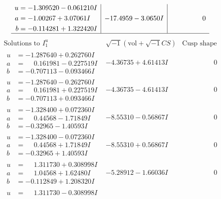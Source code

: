 \documentclass[1p]{elsarticle_modified}
\theoremstyle{definition}
\newcommand{\I}{\sqrt{-1}}
\begin{document}
$$\begin{array}{c|c|c}
\begin{aligned}
u &= -1.309520 - 0.061210 I \\
a &= -1.00267 + 3.07061 I \\
b &= -0.114281 + 1.322420 I\end{aligned}
 & -17.4959 - 3.0650 I & \phantom{-0.000000 } 0\\
 \hline 
 \end{array}$$\newpage$$\begin{array}{c|c|c}  
\text{Solutions to }I^u_{1}& \I (\text{vol} + \sqrt{-1}CS) & \text{Cusp shape}\\
 \hline 
\begin{aligned}
u &= -1.287640 + 0.262760 I \\
a &= \phantom{-}0.161981 - 0.227519 I \\
b &= -0.707113 - 0.093466 I\end{aligned}
 & -4.36735 + 4.61413 I & \phantom{-0.000000 } 0 \\ \hline\begin{aligned}
u &= -1.287640 - 0.262760 I \\
a &= \phantom{-}0.161981 + 0.227519 I \\
b &= -0.707113 + 0.093466 I\end{aligned}
 & -4.36735 - 4.61413 I & \phantom{-0.000000 } 0 \\ \hline\begin{aligned}
u &= -1.328400 + 0.072360 I \\
a &= \phantom{-}0.44568 - 1.71849 I \\
b &= -0.32965 - 1.40593 I\end{aligned}
 & -8.55310 - 0.56867 I & \phantom{-0.000000 } 0 \\ \hline\begin{aligned}
u &= -1.328400 - 0.072360 I \\
a &= \phantom{-}0.44568 + 1.71849 I \\
b &= -0.32965 + 1.40593 I\end{aligned}
 & -8.55310 + 0.56867 I & \phantom{-0.000000 } 0 \\ \hline\begin{aligned}
u &= \phantom{-}1.311730 + 0.308998 I \\
a &= \phantom{-}1.04568 + 1.62480 I \\
b &= -0.112849 + 1.208320 I\end{aligned}
 & -5.28912 - 1.66036 I & \phantom{-0.000000 } 0 \\ \hline\begin{aligned}
u &= \phantom{-}1.311730 - 0.308998 I \\

\end{aligned}
\end{array}$$
\end{document}
